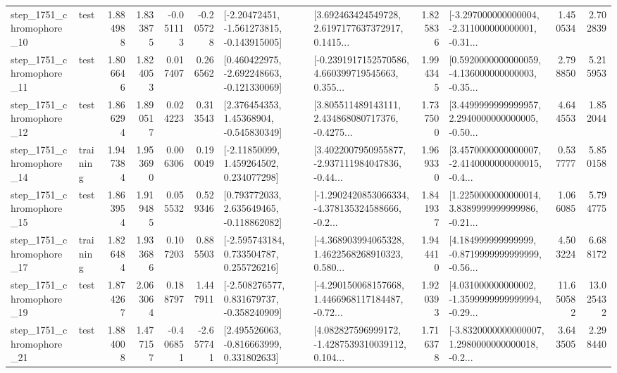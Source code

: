 \begin{tabular}{llrrrrllrlrr}
 step\_1751\_chromophore\_10 &      test &      1.884988 &    1.833875 &     -0.051113 & -0.205728 &   [-2.20472451, -1.561273815, -0.143915005] &  [3.692463424549728, 2.6197177637372917, 0.1415... &       1.825836 &  [-3.297000000000004, -2.311000000000001, -0.31... &            1.450534 &          2.702839 \\
 step\_1751\_chromophore\_11 &      test &      1.806646 &    1.824053 &      0.017407 &  0.266562 &   [0.460422975, -2.692248663, -0.121330069] &  [-0.2391917152570586, 4.660399719545663, 0.355... &       1.994345 &  [0.5920000000000059, -4.136000000000003, -0.35... &            2.798850 &          5.215953 \\
 step\_1751\_chromophore\_12 &      test &      1.866294 &    1.890517 &      0.024223 &  0.313543 &     [2.376454353, 1.45368904, -0.545830349] &  [3.805511489143111, 2.434868080717376, -0.4275... &       1.737500 &  [3.4499999999999957, 2.2940000000000005, -0.50... &            4.644553 &          1.852044 \\
 step\_1751\_chromophore\_14 &  training &      1.947384 &    1.953690 &      0.006306 &  0.190049 &     [-2.11850099, 1.459264502, 0.234077298] &  [3.4022007950955877, -2.937111984047836, -0.44... &       1.969330 &  [3.4570000000000007, -2.4140000000000015, -0.4... &            0.537777 &          5.850158 \\
 step\_1751\_chromophore\_15 &      test &      1.863954 &    1.919485 &      0.055532 &  0.529346 &    [0.793772033, 2.635649465, -0.118862082] &  [-1.2902420853066334, -4.378135324588666, -0.2... &       1.841937 &  [1.2250000000000014, 3.8389999999999986, -0.21... &            1.066085 &          5.794775 \\
 step\_1751\_chromophore\_17 &  training &      1.826484 &    1.933686 &      0.107203 &  0.885503 &    [-2.595743184, 0.733504787, 0.255726216] &  [-4.368903994065328, 1.4622568268910323, 0.580... &       1.944410 &  [4.184999999999999, -0.8719999999999999, -0.56... &            4.503224 &          6.688172 \\
 step\_1751\_chromophore\_19 &      test &      1.874267 &    2.063064 &      0.188797 &  1.447911 &   [-2.508276577, 0.831679737, -0.358240909] &  [-4.290150068157668, 1.4466968117184487, -0.72... &       1.920393 &  [4.031000000000002, -1.3599999999999994, -0.29... &           11.650582 &         13.025432 \\
 step\_1751\_chromophore\_21 &      test &      1.884008 &    1.477157 &     -0.406851 & -2.657741 &    [2.495526063, -0.816663999, 0.331802633] &  [4.082827596999172, -1.4287539310039112, 0.104... &       1.716378 &  [-3.8320000000000007, 1.2980000000000018, -0.2... &            3.643505 &          2.298440 \\

\end{tabular}
